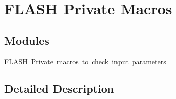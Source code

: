 \hypertarget{group___f_l_a_s_h_ex___private___macros}{}\section{F\+L\+A\+SH Private Macros}
\label{group___f_l_a_s_h_ex___private___macros}
\subsection*{Modules}
\begin{DoxyCompactItemize}
\item 
\mbox{\hyperlink{group___f_l_a_s_h_ex___i_s___f_l_a_s_h___definitions}{F\+L\+A\+S\+H Private macros to check input parameters}}
\end{DoxyCompactItemize}


\subsection{Detailed Description}
